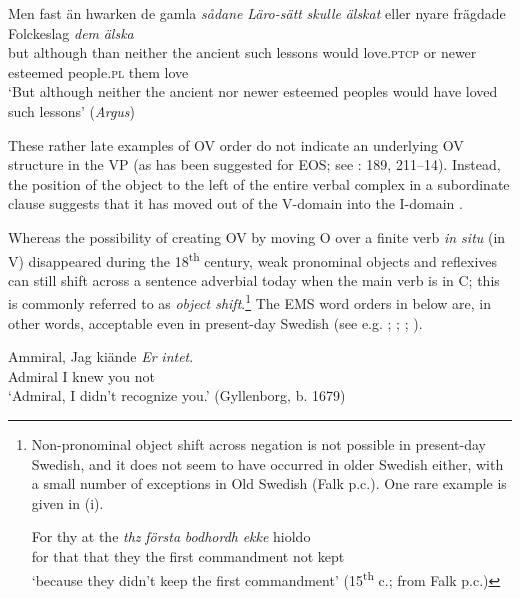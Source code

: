 \documentclass[output=paper]{langscibook}
\begin{document}
\ea
\gll Men  fast      än   hwarken de gamla \textit{sådane} \textit{Läro-sätt} \textit{skulle} \textit{älskat} eller   nyare     frägdade   Folckeslag \textit{dem} \textit{älska}\\
but     although   than   neither   the ancient  such       lessons    would  love\textsc{.ptcp} or  newer  esteemed people.\textsc{pl}  them love\\
\glt ‘But although neither the ancient nor newer esteemed peoples would have loved such lessons’ (\textit{Argus})
\z

These rather late examples of OV order do not indicate an underlying OV structure in the VP (as has been suggested for EOS; see \citealt{Delsing1999}: 189, 211–14). Instead, the position of the object to the left of the entire verbal complex in a subordinate clause suggests that it has moved out of the V-domain into the I-domain \citep{Petzell2011}. 



Whereas the possibility of creating OV by moving O over a finite verb \textit{in situ} (in V) disappeared during the 18\textsuperscript{th} century, weak pronominal objects and reflexives can still shift across a sentence adverbial today when the main verb is in C; this is commonly referred to as \textit{object shift}.\footnote{Non-pronominal
    object shift across negation is not possible in present-day Swedish, and it does not seem to have occurred in older Swedish either, with a small number of exceptions in Old Swedish (Falk p.c.). One rare example is given in (i).

    \ea
    \gll  For thy at   the \textit{thz} \textit{första} \textit{bodhordh} \textit{ekke} hioldo\\
        for that that   they   the first   commandment   not   kept\\
        \glt ‘because they didn’t keep the first commandment’ (15\textsuperscript{th} c.; from Falk p.c.)
    \z
    }
The EMS word orders in  below are, in other words, acceptable even in present-day Swedish (see e.g. \citealt{Holmberg1986}; \citealt{Andreasson2008}; \citealt{Bentzen2014}; \citealt{Erteschik-ShirJosefsson2017}).


\ea\label{ex:intro:17}
\ea\label{ex:intro:17a}
\gll  Ammiral, Jag   kiände \textit{Er} \textit{intet}.\\
    Admiral   I       knew   you       not\\
    \glt ‘Admiral, I didn’t recognize you.’ (Gyllenborg, b. 1679)
\end{document}
